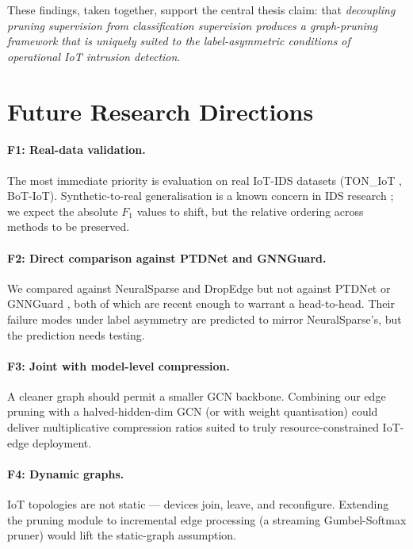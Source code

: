 \documentclass[11pt,a4paper]{report}
\theoremstyle{definition}
\theoremstyle{remark}
\begin{document}
These findings, taken together, support the central thesis claim: that
\emph{decoupling pruning supervision from classification supervision
produces a graph-pruning framework that is uniquely suited to the
label-asymmetric conditions of operational IoT intrusion detection}.

\section{Future Research Directions}

\paragraph{F1: Real-data validation.}
The most immediate priority is evaluation on real IoT-IDS datasets
(TON\_IoT \cite{moustafa2020toniot}, BoT-IoT). Synthetic-to-real
generalisation is a known concern in IDS research \cite{sommer2010outside};
we expect the absolute $F_1$ values to shift, but the relative ordering
across methods to be preserved.

\paragraph{F2: Direct comparison against PTDNet and GNNGuard.}
We compared against NeuralSparse and DropEdge but not against PTDNet
\cite{luo2021ptdnet} or GNNGuard \cite{zhang2020gnnguard}, both of which
are recent enough to warrant a head-to-head. Their failure modes under
label asymmetry are predicted to mirror NeuralSparse's, but the
prediction needs testing.

\paragraph{F3: Joint with model-level compression.}
A cleaner graph should permit a smaller GCN backbone. Combining our
edge pruning with a halved-hidden-dim GCN (or with weight quantisation)
could deliver multiplicative compression ratios suited to truly
resource-constrained IoT-edge deployment.

\paragraph{F4: Dynamic graphs.}
IoT topologies are not static --- devices join, leave, and reconfigure.
Extending the pruning module to incremental edge processing (a
streaming Gumbel-Softmax pruner) would lift the static-graph assumption.
\end{document}
